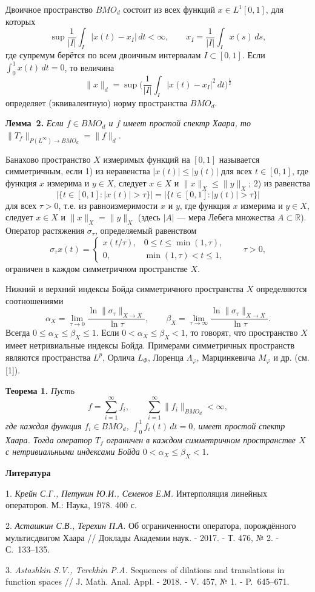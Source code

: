 Двоичное пространство $BMO_d$ состоит из всех функций $x\in L^1[0,1]$, для которых
$$
\sup\frac{1}{|I|}\int_I|x(t)-x_I|\,dt<\infty, \qquad x_I=\frac{1}{|I|}\int_Ix(s)\,ds,
$$
где супремум берётся по всем двоичным интервалам $I\subset[0,1]$. Если $\int_0^1x(t)\,dt=0$, то величина
$$
\|x\|_d=\sup\biggl(\frac{1}{|I|}\int_I|x(t)-x_I|^2\,dt\biggr)^{\frac12}
$$
определяет (эквивалентную) норму пространства $BMO_d$.

\textbf{Лемма~2.} {\it Если $f\in BMO_d$ и $f$ имеет простой спектр Хаара, то $\|T_f\|_{P(L^{\infty})\to BMO_d}=\|f\|_d$.}

Банахово пространство $X$ измеримых функций на $[0,1]$ называется симметричным, если
1) из неравенства $|x(t)|\leqslant|y(t)|$ для всех $t\in[0,1]$,
где функция $x$ измерима и $y\in X$, следует $x\in X$ и $\|x\|_X\leqslant\|y\|_X$;
2) из равенства
$$
|\{t\in[0,1]:|x(t)|>\tau\}|=|\{t\in[0,1]:|y(t)|>\tau\}|
$$
для всех $\tau>0$, т.е. из равноизмеримости $x$ и $y$, где функция $x$ измерима и $y\in X$,
следует $x\in X$ и $\|x\|_X=\|y\|_X$ (здесь $|A|$ --- мера Лебега множества $A\subset\mathbb{R}$).
Оператор растяжения $\sigma_{\tau}$, определяемый равенством
$$
\sigma_{\tau}x(t)=\begin{cases}
x(t/\tau), & 0\leqslant t\leqslant\min(1,\tau),\\
0, & \min(1,\tau)<t\leqslant1,
\end{cases}
\qquad \tau>0,
$$
ограничен в каждом симметричном пространстве $X$.

Нижний и верхний индексы Бойда симметричного пространства $X$ определяются соотношениями
$$
\alpha_X=\lim_{\tau\to0}\frac{\ln\|\sigma_{\tau}\|_{X\to X}}{\ln\tau}, \qquad
\beta_X=\lim_{\tau\to\infty}\frac{\ln\|\sigma_{\tau}\|_{X\to X}}{\ln\tau}.
$$
Всегда $0\leqslant\alpha_X\leqslant\beta_X\leqslant1$. Если $0<\alpha_X\leqslant\beta_X<1$, то говорят, что пространство $X$ имеет нетривиальные индексы Бойда.
Примерами симметричных пространств являются пространства $L^p$, Орлича $L_{\varPhi}$, Лоренца $\varLambda_{\varphi}$, Марцинкевича $M_{\varphi}$ и др. (см. [1]).

\textbf{Теорема 1.} {\it Пусть
$$
f=\sum_{i=1}^{\infty}f_i, \qquad \sum_{i=1}^{\infty}\|f_i\|_{BMO_d}<\infty,
$$
где каждая функция $f_i\in BMO_d$, $\int_0^1f_i(t)\,dt=0$, имеет простой спектр Хаара. Тогда оператор $T_f$ ограничен в каждом симметричном пространстве $X$ с нетривиальными индексами Бойда $0<\alpha_X\leqslant\beta_X<1$.}


\smallskip \centerline{\bf Литература}\nopagebreak

1. {\it Крейн С.Г., Петунин Ю.И., Семенов Е.М.} Интерполяция линейных операторов. М.: Наука, 1978. 400 с.

2. {\it Асташкин С.В., Терехин П.А.} Об ограниченности оператора, порождённого мультисдвигом Хаара // Доклады Академии наук. - 2017. -
Т. 476, № 2. - С.~133--135.

3. {\it Astashkin S.V., Terekhin P.A.} Sequences of dilations and translations in function spaces // J. Math. Anal. Appl. - 2018. -
V. 457, № 1. - P.~645--671.

